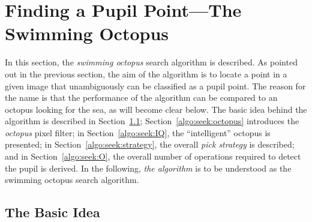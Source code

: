 
\section{Finding a Pupil Point---The Swimming Octopus}
\label{algo:seek}

In this section, the {\em swimming octopus\/} search algorithm is
described.  As pointed out in the previous section, the aim of the
algorithm is to locate a point in a given image that unambiguously can
be classified as a pupil point.  The reason for the name is that the
performance of the algorithm can be compared to an octopus looking for
the sea, as will become clear below.  The basic idea behind the
algorithm is described in Section~\ref{algo:seek:idea};
Section~\ref{algo:seek:octopus} introduces the {\em octopus\/} pixel
filter; in Section~\ref{algo:seek:IQ}, the ``intelligent'' octopus is
presented; in Section~\ref{algo:seek:strategy}, the overall {\em pick
  strategy\/} is described; and in Section~\ref{algo:seek:O}, the
overall number of operations required to detect the pupil is derived.
In the following, {\em the algorithm\/} is to be understood as the
swimming octopus search algorithm.

\subsection{The Basic Idea}
\label{algo:seek:idea}


